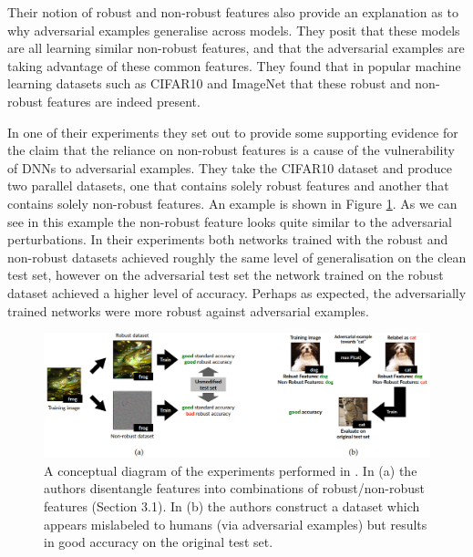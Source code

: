 \documentclass{article}
\begin{document}
Their notion of robust and non-robust features also provide an explanation as to why adversarial examples generalise across models. They posit that these models are all learning similar non-robust features, and that the adversarial examples are taking advantage of these common features. They found that in popular machine learning datasets such as CIFAR10 and ImageNet that these robust and non-robust features are indeed present.

In one of their experiments they set out to provide some supporting evidence for the claim that the reliance on non-robust features is a cause of the vulnerability of DNNs to adversarial examples. They take the CIFAR10 dataset and produce two parallel datasets, one that contains solely robust features and another that contains solely non-robust features. An example is shown in Figure \ref{fig:robust_example}. As we can see in this example the non-robust feature looks quite similar to the adversarial perturbations. In their experiments both networks trained with the robust and non-robust datasets achieved roughly the same level of generalisation on the clean test set, however on the adversarial test set the network trained on the robust dataset achieved a higher level of accuracy. Perhaps as expected, the adversarially trained networks were more robust against adversarial examples.

\begin{figure}
    \centering
    \includegraphics[width=\linewidth]{figures/robust-example.png}
    \caption{A conceptual diagram of the experiments performed in \cite{ilyas2019adversarial}. In (a) the authors disentangle features into combinations of robust/non-robust features (Section 3.1). In (b) the authors construct a dataset which appears mislabeled to humans (via adversarial examples) but results in good accuracy on the original test set.\protect\footnotemark}
    \label{fig:robust_example}
\end{figure}
\end{document}
